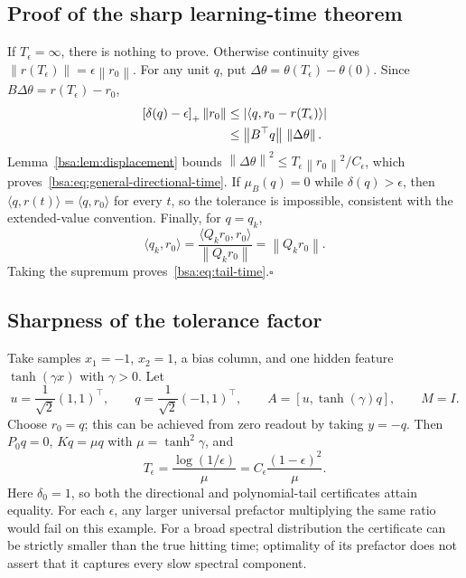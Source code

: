 \documentclass[11pt,letterpaper]{article}
\newcommand{\bsaNorm}[1]{\left\lVert #1\right\rVert}
\newcommand{\bsaPos}[1]{\left[#1\right]_+}
\theoremstyle{remark}
\theoremstyle{plain}
\begin{document}
\subsection{Proof of the sharp learning-time theorem}
If $T_\epsilon=\infty$, there is nothing to prove. Otherwise continuity gives
$\bsaNorm{r(T_\epsilon)}=\epsilon\bsaNorm{r_0}$. For any unit $q$, put $\Delta\theta=\theta(T_\epsilon)-\theta(0)$. Since $B\Delta\theta=r(T_\epsilon)-r_0$,
\begin{align}
 \bsaPos{\delta(q)-\epsilon}\bsaNorm{r_0}
 &\le |\langle q,r_0-r(T_\epsilon)\rangle|\notag\\
 &\le\bsaNorm{B^\top q}\,\bsaNorm{\Delta\theta}.
 \label{bsa:eq:necessary-movement}
\end{align}
Lemma~\ref{bsa:lem:displacement} bounds
$\bsaNorm{\Delta\theta}^2\le T_\epsilon\bsaNorm{r_0}^2/C_\epsilon$,
which proves~\eqref{bsa:eq:general-directional-time}. If $\mu_B(q)=0$ while $\delta(q)>\epsilon$, then $\langle q,r(t)\rangle=\langle q,r_0\rangle$ for every $t$, so the tolerance is impossible, consistent with the extended-value convention. Finally, for $q=q_k$,
\[
 \langle q_k,r_0\rangle
 =\frac{\langle Q_kr_0,r_0\rangle}{\bsaNorm{Q_kr_0}}
 =\bsaNorm{Q_kr_0}.
\]
Taking the supremum proves~\eqref{bsa:eq:tail-time}.\hfill$\square$

\subsection{Sharpness of the tolerance factor}
Take samples $x_1=-1$, $x_2=1$, a bias column, and one hidden feature $\tanh(\gamma x)$ with $\gamma>0$. Let
\[
 u=\frac1{\sqrt2}(1,1)^\top,\qquad
 q=\frac1{\sqrt2}(-1,1)^\top,\qquad
 A=[u,\tanh(\gamma)q],\qquad M=I.
\]
Choose $r_0=q$; this can be achieved from zero readout by taking $y=-q$. Then $P_0q=0$, $Kq=\mu q$ with $\mu=\tanh^2\gamma$, and
\[
 T_\epsilon=\frac{\log(1/\epsilon)}\mu
 =C_\epsilon\frac{(1-\epsilon)^2}{\mu}.
\]
Here $\delta_0=1$, so both the directional and polynomial-tail certificates attain equality. For each $\epsilon$, any larger universal prefactor multiplying the same ratio would fail on this example. For a broad spectral distribution the certificate can be strictly smaller than the true hitting time; optimality of its prefactor does not assert that it captures every slow spectral component.
\end{document}
